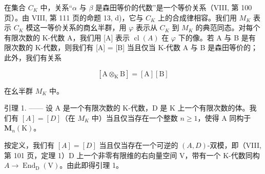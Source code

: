 在集合 \(C_{K}\) 中，关系“\(\alpha\) 与 \(\beta\) 是森田等价的代数”是一个等价关系（VIII, 第 100 页）。由 VIII, 第 111 页的命题 13, d)，它与 \(C_{K}\) 上的合成律相容。我们用 \(M_{K}\) 表示 \(C_{K}\) 模这一等价关系的商幺半群，用 \(\varphi\) 表示从 \(C_{K}\) 到 \(M_{K}\) 的典范同态。对每个有限次数的 K-代数 A，我们用 {[}A{]} 表示 \(\operatorname{cl}(A)\) 在 \(\varphi\) 下的像。若 A 与 B 是有限次数的 K-代数，则我们有 {[}A{]} = {[}B{]} 当且仅当 K-代数 A 与 B 是森田等价的；此外，我们有关系

\[
[ \mathrm{A} \otimes_ {\mathrm{K}} \mathrm{B} ] = [ \mathrm{A} ] [ \mathrm{B} ]\tag{2}
\]

在幺半群 \(M_{K}\) 中。

引理 1. —— 设 A 是一个有限次数的 K-代数，D 是 K 上一个有限次数的体。我们有 \([A]=[D]\)（在 \(M_{K}\) 中）当且仅当存在一个整数 \(n\geqslant1\)，使得 A 同构于 \(\mathbf{M}_{n}(\mathrm{K})\)。

按定义，我们有 \([A]=[D]\) 当且仅当存在一个可逆的 \((A,D)\)-双模，即（VIII, 第 101 页，定理 1）D 上一个非零有限维的右向量空间 V，带有一个 K-代数同构 \(A\to\operatorname{End}_{\mathrm{D}}(\mathrm{V})\)。由此即得引理 1。

